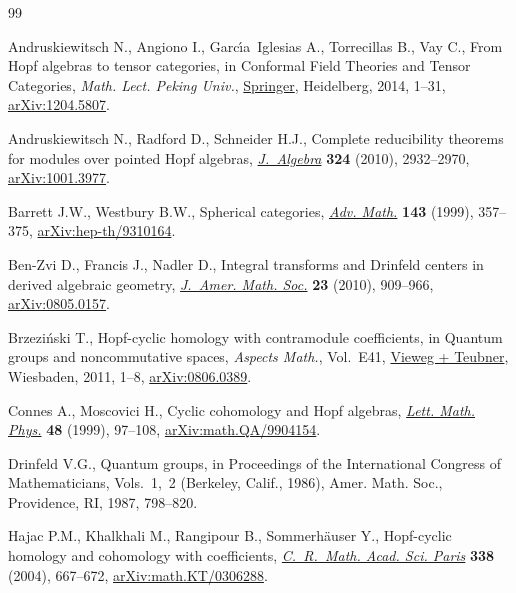 \documentclass[10pt,a4paper]{amsart}
\numberwithin{equation}{section}
\begin{document}
\begin{thebibliography}{99}
\footnotesize\itemsep=0pt

Andruskiewitsch N., Angiono I., Garc\'{\i}a~Iglesias A., Torrecillas B., Vay
 C., From {H}opf algebras to tensor ca\-te\-gories, in Conformal Field Theories
 and Tensor Categories, \textit{Math. Lect. Peking Univ.}, \href{https://doi.org/10.1007/978-3-642-39383-9_1}{Springer}, Heidelberg, 2014,
 1--31, \href{https://arxiv.org/abs/1204.5807}{arXiv:1204.5807}.

Andruskiewitsch N., Radford D., Schneider H.J., Complete reducibility theorems
 for modules over pointed {H}opf algebras, \href{https://doi.org/10.1016/j.jalgebra.2010.06.002}{\textit{J.~Algebra}} \textbf{324}
 (2010), 2932--2970, \href{https://arxiv.org/abs/1001.3977}{arXiv:1001.3977}.

Barrett J.W., Westbury B.W., Spherical categories, \href{https://doi.org/10.1006/aima.1998.1800}{\textit{Adv. Math.}}
 \textbf{143} (1999), 357--375, \href{https://arxiv.org/abs/hep-th/9310164}{arXiv:hep-th/9310164}.

Ben-Zvi D., Francis J., Nadler D., Integral transforms and {D}rinfeld centers
 in derived algebraic geometry, \href{https://doi.org/10.1090/S0894-0347-10-00669-7}{\textit{J.~Amer. Math. Soc.}} \textbf{23}
 (2010), 909--966, \href{https://arxiv.org/abs/0805.0157}{arXiv:0805.0157}.

Brzezi\'nski T., Hopf-cyclic homology with contramodule coefficients, in
 Quantum groups and noncommutative spaces, \textit{Aspects Math.}, Vol.~E41,
 \href{https://doi.org/10.1007/978-3-8348-9831-9_1}{Vieweg + Teubner}, Wiesbaden, 2011, 1--8, \href{https://arxiv.org/abs/0806.0389}{arXiv:0806.0389}.

Connes A., Moscovici H., Cyclic cohomology and {H}opf algebras, \href{https://doi.org/10.1023/A:1007527510226}{\textit{Lett.
 Math. Phys.}} \textbf{48} (1999), 97--108, \href{https://arxiv.org/abs/math.QA/9904154}{arXiv:math.QA/9904154}.

Drinfeld V.G., Quantum groups, in Proceedings of the {I}nternational {C}ongress
 of {M}athematicians, {V}ols.~1,~2 ({B}erkeley, {C}alif., 1986), Amer. Math.
 Soc., Providence, RI, 1987, 798--820.

Hajac P.M., Khalkhali M., Rangipour B., Sommerh\"auser Y., Hopf-cyclic homology
 and cohomology with coefficients, \href{https://doi.org/10.1016/j.crma.2003.11.036}{\textit{C.~R.~Math. Acad. Sci. Paris}}
 \textbf{338} (2004), 667--672, \href{https://arxiv.org/abs/math.KT/0306288}{arXiv:math.KT/0306288}.


\end{thebibliography}
\end{document}
